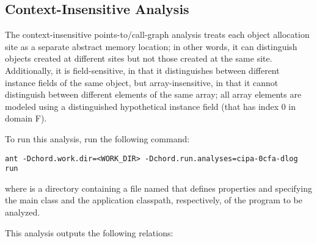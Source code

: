 \subsection{Context-Insensitive Analysis}

The context-insensitive points-to/call-graph analysis treats each object
allocation site as a separate abstract memory location; in other words, it can
distinguish objects created at different sites but not those created at the same
site.  Additionally, it is field-sensitive, in that it distinguishes between
different instance fields of the same object, but array-insensitive, in that it
cannot distinguish between different elements of the same array; all array
elements are modeled using a distinguished hypothetical instance field (that has
index 0 in domain F).

To run this analysis, run the following command:

\begin{framed}
\begin{verbatim}
ant -Dchord.work.dir=<WORK_DIR> -Dchord.run.analyses=cipa-0cfa-dlog run
\end{verbatim}
\end{framed}

where  is a directory
containing a file named  that defines
properties  and  specifying
the main class and the application classpath, respectively, of the program
to be analyzed.

This analysis outputs the following relations:


